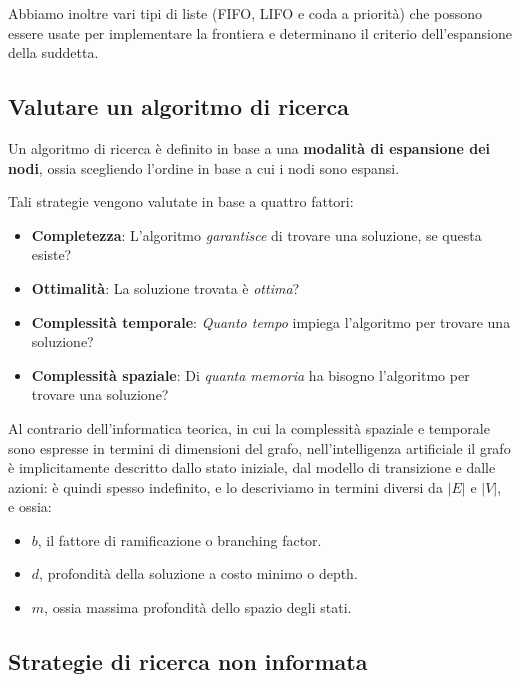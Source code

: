        Abbiamo inoltre vari tipi di liste (FIFO, LIFO e coda a priorità) che possono essere usate per implementare la frontiera e determinano il criterio dell'espansione della suddetta.
        
    \subsection{Valutare un algoritmo di ricerca}
        Un algoritmo di ricerca è definito in base a una \textbf{modalità di espansione dei nodi}, ossia scegliendo l'ordine in base a cui i nodi sono espansi.
        
        Tali strategie vengono valutate in base a quattro fattori:
        \begin{itemize}
            \item \textbf{Completezza}: L'algoritmo \textit{garantisce} di trovare una soluzione, se questa esiste?
            \item \textbf{Ottimalità}: La soluzione trovata è \textit{ottima}?
            \item \textbf{Complessità temporale}: \textit{Quanto tempo} impiega l'algoritmo per trovare una soluzione?
            \item \textbf{Complessità spaziale}: Di \textit{quanta memoria} ha bisogno l'algoritmo per trovare una soluzione?
        \end{itemize}
        
        Al contrario dell'informatica teorica, in cui la complessità spaziale e temporale sono espresse in termini di dimensioni del grafo, nell'intelligenza artificiale il grafo è implicitamente descritto dallo stato iniziale, dal modello di transizione e dalle azioni: è quindi spesso indefinito, e lo descriviamo in termini diversi da $\vert E \vert$ e $\vert V \vert$, e ossia:
        \begin{itemize}
            \item $b$, il fattore di ramificazione o branching factor.
            \item $d$, profondità della soluzione a costo minimo o depth.
            \item $m$, ossia massima profondità dello spazio degli stati.
        \end{itemize}
        
        \subsection{Strategie di ricerca non informata}
            

